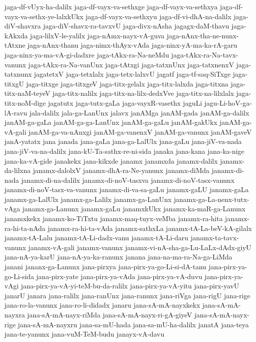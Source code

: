 {jaga-df-vUyx-ha-dalilx
jaga-df-vayx-va-sethxge
jaga-df-vayx-va-sethxya
jaga-df-vayx-va-sethx-ye-lalxkUkx
jaga-df-vayx-va-sethxyu
jaga-df-vi-dhA-na-dalilx
jaga-diV-shavxra
jaga-diV-shavx-ra-tavxvU
jaga-divx-nAsha
jagagx-daM-thavu
jaga-kAkxda
jaga-lilxV-le-yalilx
jaga-nAmx-nayx-vA-guva
jaga-nAnx-tha-ne-nunx-tAtxne
jaga-nAnx-thanu
jaga-nimx-thAyx-vAda
jaga-ninx-yA-ma-ka-rA-garu
jaga-ninx-ya-ma-vA-gi-dadxre
jaga-tAkx-ra-Na-neMdu
jaga-tAkx-ra-Na-tavx-vanunx
jaga-tAkx-ra-Na-vanUnx
jaga-tAtxgi
jaga-tatxnUnx
jaga-tatxnenxV
jaga-tatxnunx
jagatetxV
jaga-tetxlalx
jaga-tetx-lalxvU
jagatf
jaga-tf-saq-SiTxge
jaga-titxgU
jaga-titxge
jaga-titxgeV
jaga-titx-gelalx
jaga-titx-lalxda
jaga-titxna
jaga-titx-naM-teyeV
jaga-titx-nalilx
jaga-titx-na-lilx-dedxVve
jaga-titx-na-lilxlalx
jaga-titx-noM-dige
jagatutx
jaga-tutx-gaLa
jaga-vayxR-vasethx
jaguLi
jagu-Li-hoV-ga-lA-ravu
jala-dalilx
jala-ga-LanUnx
jalavx
janAMga
janAM-gada
janAM-ga-dalilx
janAM-ga-gaLa
janAM-ga-ga-LanUnx
janAM-ga-gaLu
janAM-gakUkx
janAM-ga-vA-gali
janAM-ga-va-nAnxgi
janAM-ga-vanenxV
janAM-ga-vanunx
janAM-gaveV
janA-yatatx
jana
janada
jana-gaLa
jana-ga-LalUlx
jana-gaLu
jana-jiV-va-nada
jana-jiV-va-na-dalilx
jana-kU-Ta-sathx-re-ni-sida
janaka
jana-kana
jana-ka-nige
jana-ka-vA-gide
janakekx
jana-kikxde
janamx
janamxda
janamx-dalilx
janamx-da-lilxna
janamx-dalolxV
janamx-dhA-ra-Ne-yanunx
janamx-diMda
janamx-di-nada
janamx-di-na-dalilx
janamx-di-noV-tasxva
janamx-di-noV-tasx-vanunx
janamx-di-noV-tasx-va-vanunx
janamx-di-va-sa-gaLu
janamx-gaLU
janamx-gaLa
janamx-ga-LalUlx
janamx-ga-Lalilx
janamx-ga-LanUnx
janamx-ga-La-nenx-tutx-vAga
janamx-ga-Lanunx
janamx-gaLu
janamxkUkx
janamx-ka-maR-ga-Lanunx
janamxkekx
janamx-ko-TiTxtu
janamx-maq-tuyx-veMba
janamx-ra-hita
janamx-ra-hi-ta-nAda
janamx-ra-hi-ta-vAda
janamx-sathxLa
janamx-tA-La-beV-kA-gilalx
janamx-tA-Lalu
janamx-tA-Li-dadx-vanu
janamx-tA-Li-daru
janamx-ta-tavx-vanunx
janamx-vA-gali
janamx-vanunx
janamx-vi-nA-sha-ga-Lu-LaLx-dAdx-giyU
jana-nA-ya-karU
jana-nA-ya-ka-ranunx
janana
jana-na-ma-ra-Na-ga-LiMda
janani
jananx-ga-Lanunx
jana-pirxya
jana-pirx-ya-go-Li-si-dA-tanu
jana-pirx-ya-go-Li-sida
jana-pirx-yate
jana-pirx-ya-vAda
jana-pirx-ya-vA-duvu
jana-pirx-ya-vAgi
jana-pirx-ya-vA-yi-teM-bu-da-ralilx
jana-pirx-ya-vA-yitu
jana-pirx-yavU
janarU
janara
jana-ralilx
jana-ranUnx
jana-ranunx
jana-riVga
jana-rigU
jana-rige
jana-ro-la-vanunx
jana-ro-li-didadx
janaru
jana-sA-mA-nayxkekx
jana-sA-mA-nayxra
jana-sA-mA-nayx-riMda
jana-sA-mA-nayx-ri-gA-giyeV
jana-sA-mA-nayx-rige
jana-sA-mA-nayxru
jana-sa-mU-hada
jana-sa-mU-ha-dalilx
janatA
jana-teya
jana-te-yanunx
jana-vuM-TeM-budu
janayx-vA-davu
}
